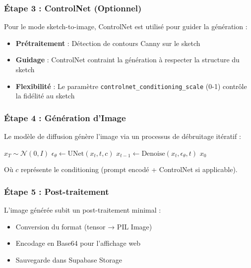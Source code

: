 \subsubsection{Étape 3 : ControlNet (Optionnel)}

Pour le mode sketch-to-image, ControlNet \cite{zhang2017controlnet} est utilisé pour guider la génération :

\begin{itemize}[leftmargin=*]
    \item \textbf{Prétraitement} : Détection de contours Canny sur le sketch
    \item \textbf{Guidage} : ControlNet contraint la génération à respecter la structure du sketch
    \item \textbf{Flexibilité} : Le paramètre \texttt{controlnet\_conditioning\_scale} (0-1) contrôle la fidélité au sketch
\end{itemize}

\subsubsection{Étape 4 : Génération d'Image}

Le modèle de diffusion génère l'image via un processus de débruitage itératif :

\begin{algorithm}[H]
\caption{Processus de génération par diffusion}
\begin{algorithmic}[1]
\State $x_T \sim \mathcal{N}(0, I)$ 
    \State $\epsilon_\theta \gets \text{UNet}(x_t, t, c)$ 
    \State $x_{t-1} \gets \text{Denoise}(x_t, \epsilon_\theta, t)$ 
\EndFor
\State \Return $x_0$ 
\end{algorithmic}
\end{algorithm}

Où $c$ représente le conditioning (prompt encodé + ControlNet si applicable).

\subsubsection{Étape 5 : Post-traitement}

L'image générée subit un post-traitement minimal :
\begin{itemize}[leftmargin=*]
    \item Conversion du format (tensor → PIL Image)
    \item Encodage en Base64 pour l'affichage web
    \item Sauvegarde dans Supabase Storage
\end{itemize}

